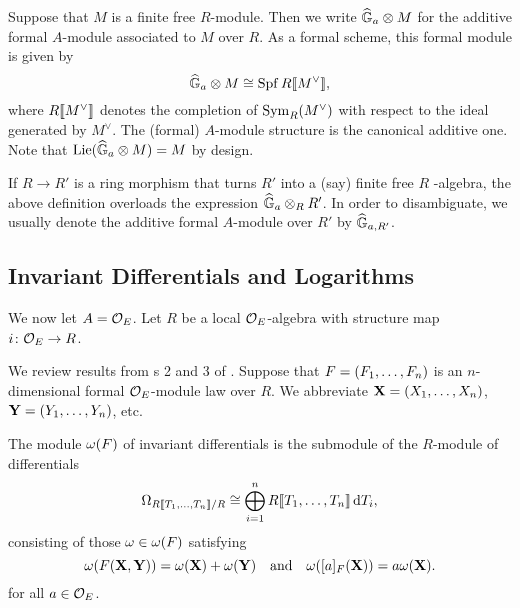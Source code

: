 \documentclass[../main.tex]{subfiles}
\begin{document}
\begin{defi}
  \label{def:additiveformalmoduleassociatedtomodule}
  Suppose that $M$ is a finite free $R$-module. Then we write
  $\widehat{\mathbb{G}}_a \otimes M$ for the additive formal $A$-module associated to $M$ over $R$.
  As a formal scheme, this formal module is given by
  \begin{equation*}
    \widehat{\mathbb{G}}_a \otimes M \cong \operatorname{Spf} R \llbracket M^\vee \rrbracket,
  \end{equation*}
  where $R \llbracket M^\vee \rrbracket$ denotes the completion of $\operatorname{Sym}_R(M^\vee)$ with respect
  to the ideal generated by $M^\vee$. The (formal) $A$-module structure is the
  canonical additive one. 
  Note that $\operatorname{Lie}(\widehat{\mathbb{G}}_a \otimes M) = M$ by design. 
  \end{defi}
\begin{rmk} 
  If $R\to R'$ is a ring morphism that turns $R'$ into a (say) finite free
$R$ -algebra, the above definition overloads the expression $\widehat{\mathbb{G}}_a \otimes_R R'$.
  In order to disambiguate, we usually denote the additive formal $A$-module
  over $R'$ by $\widehat{\mathbb{G}}_{a, R'}$. 
\end{rmk}


\subsection{Invariant Differentials and Logarithms} %
\label{sub:Logarithms}
We now let $A = {\mathcal{O}_E}$. Let $R$ be a local ${\mathcal{O}_E}$-algebra with structure
map $i\colon  {\mathcal{O}_E} \to R$.

We review results from s
2 and 3 of \cite{hopkins1994equivariant}. 
Suppose that ${F} = (F_1, \dots, F_n)$ is an $n$-dimensional formal ${\mathcal{O}_E}$-module
law over $R$. We abbreviate $\mathbf{X} = (X_1, \dots, X_n)$, $\mathbf{Y} = (Y_1,
\dots, Y_n)$, etc.

\begin{defi}
  The module $\omega({F})$ of invariant differentials is the submodule of the
  $R$-module of differentials
  \begin{equation*}
    \Omega_{R\llbracket T_1, \dots, T_n \rrbracket/R} \cong \bigoplus_{i=1}^n R\llbracket T_1,
    \dots, T_n
    \rrbracket \, \mathrm{d} T_i,
  \end{equation*}
  consisting of those $\omega \in \omega({F})$ satisfying
  \begin{equation}\label{eq:diffcond}
    \omega({F}(\mathbf{X},\mathbf{Y})) = \omega(\mathbf{X}) + \omega(\mathbf{Y})\quad \text{and} \quad
    \omega([a]_{F}(\mathbf{X})) = a\omega(\mathbf{X}).
  \end{equation} 
  for all $a \in {\mathcal{O}_E}$. 
\end{defi}
\end{document}
